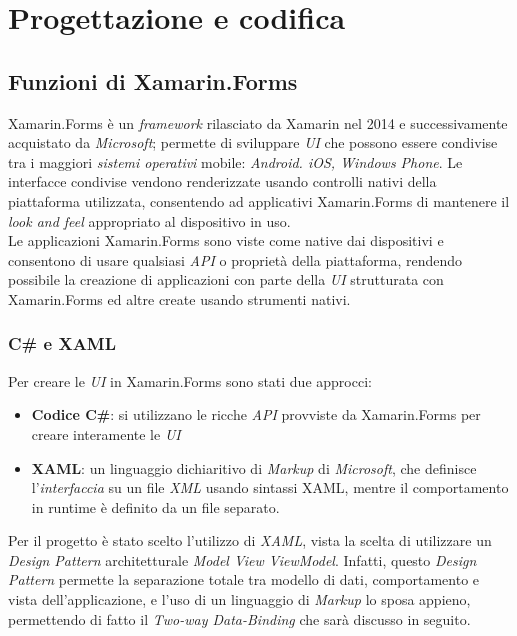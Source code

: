 \newpage
\chapter{Progettazione e codifica}
\label{cap:progettazione-codifica}
\section{Funzioni di Xamarin.Forms}
Xamarin.Forms è un \textit{framework} rilasciato da Xamarin nel 2014 e successivamente acquistato da \textit{Microsoft}; permette di sviluppare \textit{UI} che possono essere condivise tra i maggiori \textit{sistemi operativi} mobile: \textit{Android. iOS, Windows Phone}. Le interfacce condivise vendono renderizzate usando controlli nativi della piattaforma utilizzata, consentendo ad applicativi Xamarin.Forms di mantenere il \textit{look and feel} appropriato al dispositivo in uso. \\
Le applicazioni Xamarin.Forms sono viste come native dai dispositivi e consentono di usare qualsiasi \textit{API} o proprietà della piattaforma, rendendo possibile la creazione di applicazioni con parte della \textit{UI} strutturata con Xamarin.Forms ed altre create usando strumenti nativi.
\subsection{C\# e XAML}
Per creare le \textit{UI} in Xamarin.Forms sono stati due approcci:
\begin{itemize}
	\item \textbf{Codice C\#}: si utilizzano le ricche \textit{API} provviste da Xamarin.Forms per creare interamente le \textit{UI}
	\item \textbf{XAML}: un linguaggio dichiaritivo di \textit{Markup} di \textit{Microsoft}, che definisce l'\textit{interfaccia} su un file \textit{XML} usando sintassi XAML, mentre il comportamento in runtime è definito da un file separato.
\end{itemize}
Per il progetto è stato scelto l'utilizzo di \textit{XAML}, vista la scelta di utilizzare un \textit{Design Pattern} architetturale \textit{Model View ViewModel}. Infatti, questo \textit{Design Pattern} permette la separazione totale tra modello di dati, comportamento e vista dell'applicazione, e l'uso di un linguaggio di \textit{Markup} lo sposa appieno, permettendo di fatto il \textit{Two-way Data-Binding} che sarà discusso in seguito.
